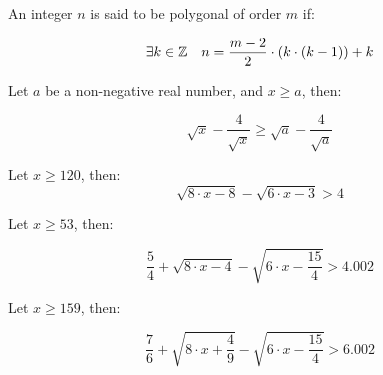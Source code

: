 %

\begin{definition}
    \label{def:Polygonal}
    \leanok
    An integer $n$ is said to be polygonal of order $m$ if:

    \[
        \exists k \in \mathbb{Z} \quad n = \frac{m-2}{2}\cdot (k \cdot (k-1)) + k
    \]
\end{definition}

\begin{lemma}[lemma1]
    \label{lem:lemma1}
    \leanok
    Let $a$ be a non-negative real number, and $x\geq a$, then:

    \[
        \sqrt{x} - \frac{4}{\sqrt{x}} \geq \sqrt{a} - \frac{4}{\sqrt{a}}
    \]
\end{lemma}

\begin{lemma}[lemma2]
    \label{lem:lemma2}
    \leanok
    Let $x\geq 120$, then:
    \[
        \sqrt{8\cdot x - 8} - \sqrt{6\cdot x - 3} > 4
    \]
\end{lemma}

\begin{corollary}[cor2]
    \label{cor:cor2}
    \leanok

    Let $x \geq 53$, then:

    \[
        \frac{5}{4} + \sqrt{8\cdot x - 4} - \sqrt{6\cdot x - \frac{15}{4}} > 4.002
    \]
\end{corollary}

\begin{corollary}[cor3]
    \label{cor:cor3}
    \leanok

    Let $x\geq 159$, then:

    \[
        \frac{7}{6} + \sqrt{8\cdot x + \frac{4}{9}} - \sqrt{6\cdot x - \frac{15}{4}} > 6.002
    \]
\end{corollary}

